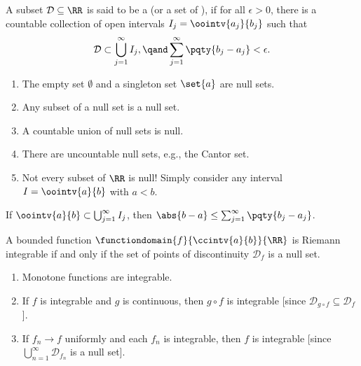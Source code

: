 \begin{definition}
    A subset \(\mathcal{D} \subseteq \RR\) is said to be a  (or a set of ), if for all \(\epsilon > 0\), there is a countable collection of open intervals \(I_j = \oointv{a_j}{b_j}\) such that
    \[
        \mathcal{D} \subset \bigcup_{j = 1}^{\infty} I_j, \qand \sum_{j = 1}^{\infty} \pqty{b_j - a_j} < \epsilon.
    \]
\end{definition}

\begin{examples}
    \begin{enumerate}
        \item The empty set \(\emptyset\) and a singleton set \(\set{a}\) are null sets.
        \item Any subset of a null set is a null set.
        \item A countable union of null sets is null.
        \item There are uncountable null sets, e.g., the Cantor set.
        \item Not every subset of \(\RR\) is null! Simply consider any interval \(I = \oointv{a}{b}\) with \(a < b\).
    \end{enumerate}
\end{examples}

\begin{lemma}
    If \(\oointv{a}{b} \subset \bigcup_{j = 1}^{\infty} I_j\), then \(\abs{b - a} \leq \sum_{j = 1}^{\infty} \pqty{b_j - a_j}\).
\end{lemma}

\begin{theorem}
    \label{thm:lebesgue-criterion-for-riemann-integrability}%
    A bounded function \(\functiondomain{f}{\ccintv{a}{b}}{\RR}\) is Riemann integrable if and only if the set of points of discontinuity \(\mathcal{D}_f\) is a null set.
\end{theorem}

\begin{corollary}
    \begin{enumerate}
        \item Monotone functions are integrable.
        \item If \(f\) is integrable and \(g\) is continuous, then \(g \circ f\) is integrable [since \(\mathcal{D}_{g \circ f} \subseteq \mathcal{D}_f\)].
        \item If \(f_n \to f\) uniformly and each \(f_n\) is integrable, then \(f\) is integrable [since \(\bigcup_{n = 1}^{\infty} \mathcal{D}_{f_n}\) is a null set].
   \end{enumerate}
\end{corollary}

\normalsize